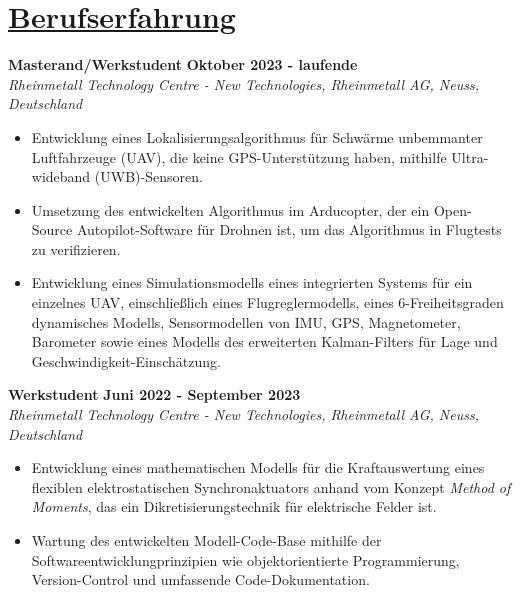 \section{\underline{Berufserfahrung}}

\large{\textbf{Masterand/Werkstudent}}
\hfill
\large{\textbf{Oktober 2023 - laufende}}\\
\large{\emph{Rheinmetall Technology Centre - New Technologies, Rheinmetall AG, Neuss, Deutschland}}
\begin{itemize}
	\item Entwicklung eines Lokalisierungsalgorithmus für Schwärme unbemmanter Luftfahrzeuge (UAV), die keine GPS-Unterstützung haben, mithilfe Ultra-wideband (UWB)-Sensoren.
	\item Umsetzung des entwickelten Algorithmus im Arducopter, der ein Open-Source Autopilot-Software für Drohnen ist, um das Algorithmus in Flugtests zu verifizieren.
	\item Entwicklung eines Simulationsmodells eines integrierten Systems für ein einzelnes UAV, einschließlich eines Flugreglermodells, eines 6-Freiheitsgraden dynamisches Modells, Sensormodellen von IMU, GPS, Magnetometer, Barometer sowie eines Modells des erweiterten Kalman-Filters für Lage und Geschwindigkeit-Einschätzung.
\end{itemize}

\vspace{0.1 in}

\large{\textbf{Werkstudent}}
\hfill
\large{\textbf{Juni 2022 - September 2023}}\\
\large{\emph{Rheinmetall Technology Centre - New Technologies, Rheinmetall AG, Neuss, Deutschland}}
\begin{itemize}
	\item\large{Entwicklung eines mathematischen Modells für die Kraftauswertung eines flexiblen elektrostatischen Synchronaktuators anhand vom Konzept \emph{Method of Moments}, das ein Dikretisierungstechnik für elektrische Felder ist.}
	\item\large{Wartung des entwickelten Modell-Code-Base mithilfe der Softwareentwicklungprinzipien wie objektorientierte Programmierung, Version-Control und umfassende Code-Dokumentation.}
\end{itemize}

\vspace{0.1 in}

